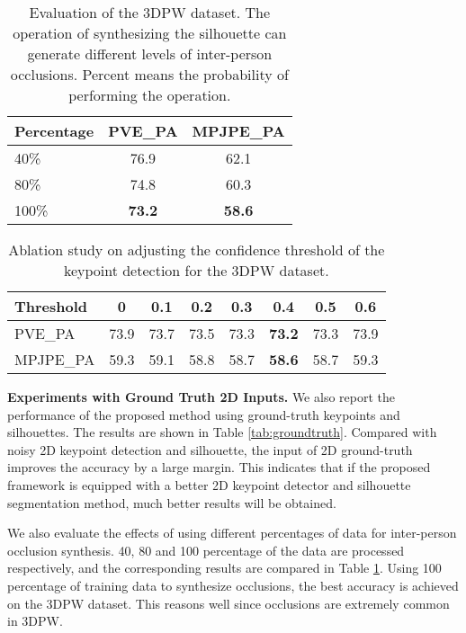 \documentclass[journal]{IEEEtran}
\begin{document}
\begin{table}[!htbp]
\caption{Evaluation of the 3DPW dataset. The operation of synthesizing the silhouette can generate different levels of inter-person occlusions. Percent means the probability of performing the operation.}
\begin{center}
\begin{tabular}{@{}lcc@{}}
\toprule
Percentage & PVE\_PA & MPJPE\_PA \\ \midrule
40\%       & 76.9    & 62.1      \\
80\%       & 74.8    & 60.3      \\
100\%      & \textbf{73.2}    & \textbf{58.6}      \\ \bottomrule
\end{tabular}
\label{percentage}
\end{center}
\end{table}




\begin{table}[!htbp]
\caption{Ablation study on adjusting the confidence threshold of the keypoint detection for the 3DPW dataset.}
\begin{center}
\begin{tabular}{lccccccc}
\hline
Threshold & 0    & 0.1  & 0.2  & 0.3  & 0.4  & 0.5  & 0.6  \\ \hline
PVE\_PA   & 73.9 & 73.7 & 73.5 & 73.3 & \textbf{73.2} & 73.3 & 73.9 \\ \hline
MPJPE\_PA & 59.3 & 59.1 & 58.8 & 58.7 & \textbf{58.6} & 58.7 & 59.3 \\ \hline
\end{tabular}
\label{confidence}
\end{center}
\end{table}
\vspace{-0.2cm}

\noindent\textbf{Experiments with Ground Truth 2D Inputs.}  We also report the performance of the proposed method using ground-truth keypoints and silhouettes. The results are shown in Table \ref{tab:groundtruth}. Compared with noisy 2D keypoint detection and silhouette,  the input of 2D ground-truth improves the accuracy by a large margin. This indicates that if the proposed framework is equipped with a better 2D keypoint detector and silhouette segmentation method, much better results will be obtained.

We also evaluate the effects of using different percentages of data for inter-person occlusion synthesis. 40, 80 and 100 percentage of the data are processed respectively, and the corresponding results are compared in Table \ref{percentage}. Using 100 percentage of training data to synthesize occlusions, the best accuracy is achieved on the 3DPW dataset. This reasons well since occlusions are extremely common in 3DPW.
\end{document}
